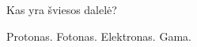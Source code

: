 \question Kas yra šviesos dalelė? \begin{choices}
	\choice Protonas.
	\choice Fotonas.
	\choice Elektronas.
	\choice Gama.
\end{choices}